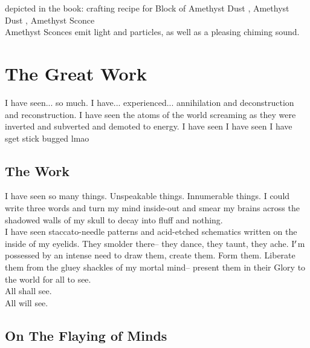 \documentclass[12pt]{article}
\begin{document}
  
  depicted in the book: crafting recipe for 
    Block of Amethyst Dust
,     Amethyst Dust
,     Amethyst Sconce
\\

      Amethyst Sconces emit light and particles, as well as a pleasing chiming sound.\\


\newpage

\label{sec:greatwork}

\section*{The Great Work}
  I have seen... so much. I have... experienced... annihilation and deconstruction and reconstruction. I have seen the atoms of the world screaming as they were inverted and subverted and demoted to energy. I have seen I have seen I have sget stick bugged lmao\\



\label{sec:greatwork/the_work}
\subsection*{The Work}


  
    I have seen so many things. Unspeakable things. Innumerable things. I could write three words and turn my mind inside-out and smear my brains across the shadowed walls of my skull to decay into fluff and nothing.\\


  
    I have seen staccato-needle patterns and acid-etched schematics written on the inside of my eyelids. They smolder there-- they dance, they taunt, they ache. I$\rq$m possessed by an intense need to draw them, create them. Form them. Liberate them from the gluey shackles of my mortal mind-- present them in their Glory to the world for all to see.\\All shall see.\\All will see.\\

\newpage

\label{sec:greatwork/brainsweeping}
\subsection*{On The Flaying of Minds}
\end{document}
